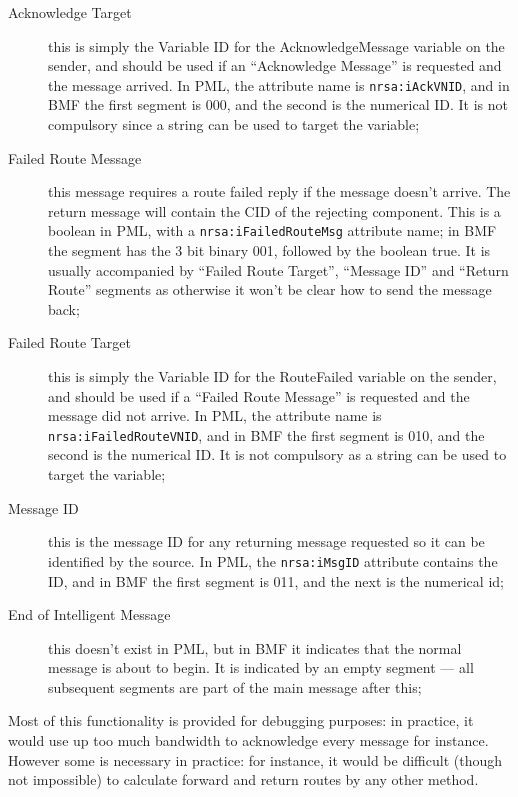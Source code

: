 \documentclass[pdftex,a4paper]{article}
\newcommand{\XMLfont}[1]{{\tt \small #1}}
\begin{document}
\begin{description}
\item[Acknowledge Target] this is simply the Variable ID for the
  AcknowledgeMessage variable on the sender, and should be used if an
  ``Acknowledge Message'' is requested and the message arrived. In
  PML, the attribute name is \XMLfont{nrsa:iAckVNID}, and in BMF the first
  segment is 000, and the second is the numerical ID. It is not
  compulsory since a string can be used to target the variable;

\item[Failed Route Message] this message requires a route failed reply
  if the message doesn't arrive. The return message will contain the
  CID of the rejecting component. This is a boolean in PML, with a
  \XMLfont{nrsa:iFailedRouteMsg} attribute name; in BMF the segment has the
  3 bit binary 001, followed by the boolean true. It is usually
  accompanied by ``Failed Route Target'', ``Message ID'' and ``Return
  Route'' segments as otherwise it won't be clear how to send the
  message back;

\item[Failed Route Target] this is simply the Variable ID for the
  RouteFailed variable on the sender, and should be used if a ``Failed
  Route Message'' is requested and the message did not arrive. In PML,
  the attribute name is \XMLfont{nrsa:iFailedRouteVNID}, and in BMF the
  first segment is 010, and the second is the numerical ID. It is not
  compulsory as a string can be used to target the variable;

\item[Message ID] this is the message ID for any returning message
  requested so it can be identified by the source. In PML, the
  \XMLfont{nrsa:iMsgID} attribute contains the ID, and in BMF the first
  segment is 011, and the next is the numerical id;

\item[End of Intelligent Message] this doesn't exist in PML, but in
  BMF it indicates that the normal message is about to begin. It is
  indicated by an empty segment --- all subsequent segments are part
  of the main message after this;

\end{description}

Most of this functionality is provided for debugging purposes: in
practice, it would use up too much bandwidth to acknowledge every
message for instance. However some is necessary in practice: for
instance, it would be difficult (though not impossible) to calculate
forward and return routes by any other method.
\end{document}
